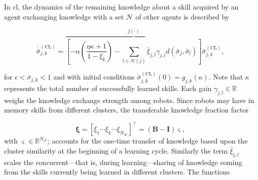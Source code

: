 \documentclass[12pt]{article}
\begin{document}
In \ac{cl}, the dynamics of the remaining knowledge  about a skill acquired by an agent exchanging knowledge with a set $\mathcal{N}$ of other agents is described by

\begin{equation}\label{eq:collective_knowledge_dynamics}
	\dot{\bar{\sigma}}^{(\text{CL})}_{j,k} =
		\overbrace{\left[-\alpha \left( \frac{\eta \kappa + 1}{1 - \xi_k} \right)  - \sum\limits_{l \in \mathcal{N}(j)} \bar{\xi}_{j,l} \gamma_{j,l} d(\bar{\sigma}_j,\bar{\sigma}_l)\right]}^{f(\cdot)} \bar{\sigma}^{(\text{CL})}_{j,k},
\end{equation}

\noindent for $\epsilon < \bar{\sigma}_{j,k} < 1$ and with initial conditions $\bar{\sigma}^{(\text{CL})}_{j,k}(0) = g_{j,k}\left(\kappa\right)$. Note that $\kappa$ represents the total number of successfully learned skills. Each gain $\gamma_{j,l} \in \mathbb{R} $ weighs the knowledge exchange strength among robots. Since robots may have in memory skills from different clusters, the transferable knowledge fraction factor

\begin{equation} 
	\bm{\xi} = [\xi_1 \cdots \xi_k \cdots \xi_{N_\mathcal{K}}]^\intercal = (\bm{B} - \bm{I}) \bm{\varsigma} ,
\end{equation}
with $\bm{\varsigma} \in \mathbb{R}^{N_\mathcal{K}}$; accounts for the one-time transfer of knowledge based upon the cluster similarity at the beginning of a learning cycle. Similarly the term $ \bar{\xi}_{j,l} $ scales the concurrent---that is, during learning---sharing of knowledge coming from the skills currently being learned in different clusters. The functions
\end{document}
